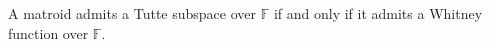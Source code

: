 A matroid admits a Tutte subspace over $\mathbb{F}$ if and only if it admits a Whitney function over $\mathbb{F}$.
